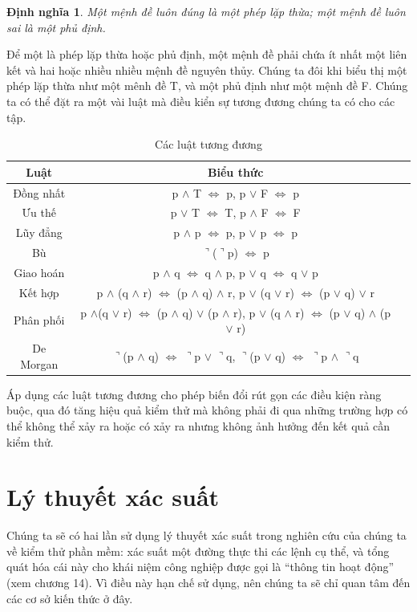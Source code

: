 \documentclass[11pt,a4paper,oneside]{article}
\newtheorem{modeling_def}{Định nghĩa }
\begin{document}
\begin{modeling_def}
Một mệnh đề luôn đúng là một phép lặp thừa; một mệnh đề luôn sai là một phủ định.
\end{modeling_def}

Để một là phép lặp thừa hoặc phủ định, một mệnh đề phải chứa ít nhất một liên kết và hai hoặc nhiều nhiều mệnh đề nguyên thủy. Chúng ta đôi khi biểu thị một phép lặp thừa như một mênh đề T, và một phủ định như một mệnh đề F. Chúng ta có thể đặt ra một vài luật mà điều kiển sự tương đương chúng ta có cho các tập.

\begin{table}
\centering
\caption{Các luật tương đương}
\begin{tabular}{|c|c|l|} 
\hline Luật&Biểu thức\\
\hline Đồng nhất&p $\wedge$ T $\Leftrightarrow$ p, p $\vee$ F $\Leftrightarrow$ p\\ 
\hline Ưu thế&p $\vee$ T $\Leftrightarrow$ T, p $\wedge$ F $\Leftrightarrow$ F\\ 
\hline Lũy đẳng&p $\wedge$ p $\Leftrightarrow$ p, p $\vee$ p $\Leftrightarrow$ p\\ 
\hline Bù&$\urcorner$($\urcorner$p) $\Leftrightarrow$ p\\
\hline Giao hoán&p $\wedge$ q $\Leftrightarrow$ q $\wedge$ p, p $\vee$ q $\Leftrightarrow$ q $\vee$ p\\
\hline Kết hợp&p $\wedge$ (q $\wedge$ r) $\Leftrightarrow$ (p $\wedge$ q) $\wedge$ r, p $\vee$ (q $\vee$ r) $\Leftrightarrow$ (p $\vee$ q) $\vee$ r\\
\hline Phân phối&p $\wedge$(q $\vee$ r) $\Leftrightarrow$ (p $\wedge$ q) $\vee$ (p $\wedge$ r), p $\vee$ (q $\wedge$ r) $\Leftrightarrow$ (p $\vee$ q) $\wedge$ (p $\vee$ r)\\
\hline De Morgan&$\urcorner$(p $\wedge$ q) $\Leftrightarrow$ $\urcorner$p $\vee$ $\urcorner$q, $\urcorner$(p $\vee$ q) $\Leftrightarrow$ $\urcorner$p $\wedge$ $\urcorner$q \\
\hline\end{tabular}
\end{table}

Áp dụng các luật tương đương cho phép biến đổi rút gọn các điều kiện ràng
buộc, qua đó tăng hiệu quả kiểm thử mà không phải đi qua những trường hợp có thể
không thể xảy ra hoặc có xảy ra nhưng không ảnh hưởng đến kết quả cần kiểm thử.
\section{Lý thuyết xác suất}
Chúng ta sẽ có hai lần sử dụng lý thuyết xác suất trong nghiên cứu của chúng ta về kiểm thử phần mềm: xác suất một đường thực thi các lệnh cụ thể, và tổng quát hóa cái này cho khái niệm công nghiệp được gọi là “thông tin hoạt động” (xem chương 14). Vì điều này hạn chế sử dụng, nên chúng ta sẽ chỉ quan tâm đến các cơ sở kiến thức ở đây.
\end{document}
